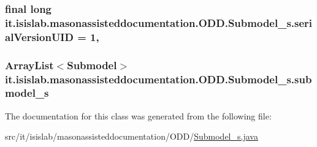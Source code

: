 \hypertarget{classit_1_1isislab_1_1masonassisteddocumentation_1_1_o_d_d_1_1_submodel__s_a86bdb1c503034615ce794e3f3aca58c9}{
\subsubsection[{serial\-Version\-U\-I\-D}]{\setlength{\rightskip}{0pt plus 5cm}final long it.\-isislab.\-masonassisteddocumentation.\-O\-D\-D.\-Submodel\-\_\-s.\-serial\-Version\-U\-I\-D = 1\hspace{0.3cm}{\ttfamily [static]}, {\ttfamily [private]}}}\label{classit_1_1isislab_1_1masonassisteddocumentation_1_1_o_d_d_1_1_submodel__s_a86bdb1c503034615ce794e3f3aca58c9}
\hypertarget{classit_1_1isislab_1_1masonassisteddocumentation_1_1_o_d_d_1_1_submodel__s_a0a87b09550e1e4503c7eaad25838543d}{
\subsubsection[{submodel\-\_\-s}]{\setlength{\rightskip}{0pt plus 5cm}Array\-List$<${\bf Submodel}$>$ it.\-isislab.\-masonassisteddocumentation.\-O\-D\-D.\-Submodel\-\_\-s.\-submodel\-\_\-s\hspace{0.3cm}{\ttfamily [private]}}}\label{classit_1_1isislab_1_1masonassisteddocumentation_1_1_o_d_d_1_1_submodel__s_a0a87b09550e1e4503c7eaad25838543d}


The documentation for this class was generated from the following file\-:\begin{DoxyCompactItemize}
\item 
src/it/isislab/masonassisteddocumentation/\-O\-D\-D/\hyperlink{_submodel__s_8java}{Submodel\-\_\-s.\-java}\end{DoxyCompactItemize}
